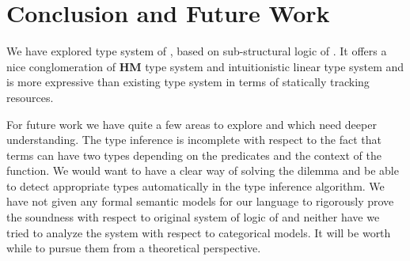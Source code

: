 \chapter{Conclusion and Future Work}\label{chp:conclusion}

We have explored type system of \qub{}, based on sub-structural logic of \BI{}.
It offers a nice conglomeration of \textbf{HM} type system and intuitionistic linear type system and is more
expressive than existing type system in terms of statically tracking resources.


For future work we have quite a few areas to explore and which need deeper understanding.
The \qub{} type inference is incomplete with respect to the fact that terms can have two types depending
on the predicates and the context of the function. We would want to have a clear way of solving
the dilemma and be able to detect appropriate types automatically in the type inference algorithm.
We have not given any formal semantic models for our language to rigorously prove the soundness with respect to original
system of logic of \BI{} and neither have we tried to analyze the system with respect to categorical models.
It will be worth while to pursue them from a theoretical perspective.